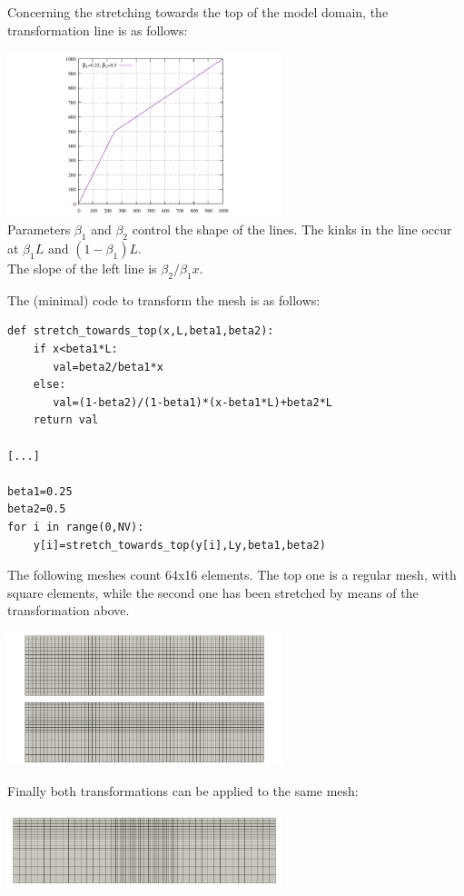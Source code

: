 Concerning the stretching towards the top of the model domain, the transformation line is as follows:

\begin{center}
\includegraphics[width=8cm]{images/meshes/stretching/stretch_towards_top}\\
{\captionfont Parameters $\beta_1$ and $\beta_2$ control the shape of the lines. The kinks in the 
line occur at $\beta_1 L$ and $(1-\beta_1)L$.\\ The slope of the left line is $\beta_2/\beta_1 x$.}
\end{center}

The (minimal) code to transform the mesh is as follows:
\begin{lstlisting}
def stretch_towards_top(x,L,beta1,beta2):
    if x<beta1*L: 
       val=beta2/beta1*x
    else:
       val=(1-beta2)/(1-beta1)*(x-beta1*L)+beta2*L
    return val

[...]

beta1=0.25
beta2=0.5
for i in range(0,NV):
    y[i]=stretch_towards_top(y[i],Ly,beta1,beta2)
\end{lstlisting}


The following meshes count 64x16 elements. The top one is a regular mesh, with square elements, 
while the second one has been stretched by means of the transformation above.
\begin{center}
\includegraphics[width=8cm]{images/meshes/stretching/stretch_y}
\end{center}

Finally both transformations can be applied to the same mesh:
\begin{center}
\includegraphics[width=8cm]{images/meshes/stretching/stretch_xy}
\end{center}

